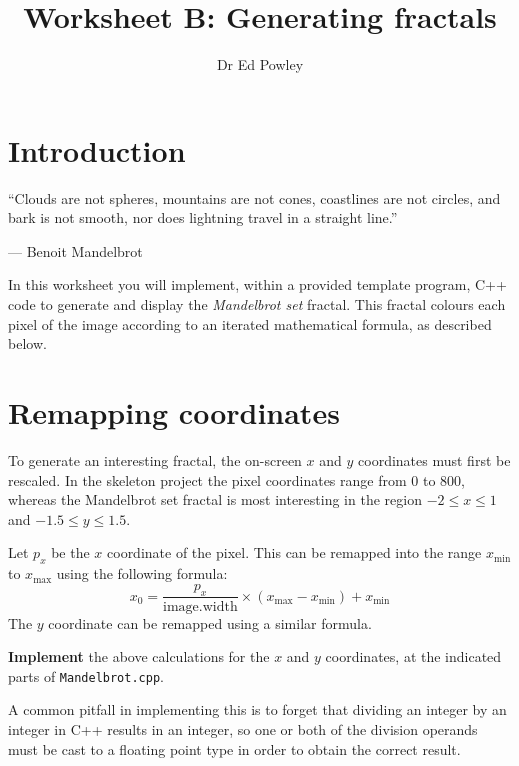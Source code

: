 \documentclass{../../fal_assignment}
\title{Worksheet B: Generating fractals}
\author{Dr Ed Powley}
\begin{document}
\maketitle

\section*{Introduction}

\begin{marginquote}
``Clouds are not spheres, mountains are not cones, coastlines are not circles, and bark is not smooth, nor does lightning travel in a straight line.''

--- Benoit Mandelbrot
\end{marginquote}

In this worksheet you will implement, within a provided template program,
C++ code to generate and display the \emph{Mandelbrot set} fractal.
This fractal colours each pixel of the image according to an iterated mathematical formula, as described below.

\section{Remapping coordinates}

To generate an interesting fractal, the on-screen $x$ and $y$ coordinates must first be rescaled.
In the skeleton project the pixel coordinates range from $0$ to $800$,
whereas the Mandelbrot set fractal is most interesting in the region $-2 \leq x \leq 1$ and $-1.5 \leq y \leq 1.5$.

Let $p_x$ be the $x$ coordinate of the pixel. This can be remapped into the range $x_{\text{min}}$ to $x_{\text{max}}$ using the following formula:
\begin{equation*}
    x_0 = \frac{p_x}{\text{image.width}} \times \left( x_{\text{max}} - x_{\text{min}} \right) + x_{\text{min}}
\end{equation*}
The $y$ coordinate can be remapped using a similar formula.

\textbf{Implement} the above calculations for the $x$ and $y$ coordinates, at the indicated parts of \texttt{Mandelbrot.cpp}.

A common pitfall in implementing this is to forget that dividing an integer by an integer in C++ results in an
integer, so one or both of the division operands must be cast to a floating point type in order to obtain
the correct result.
\end{document}
